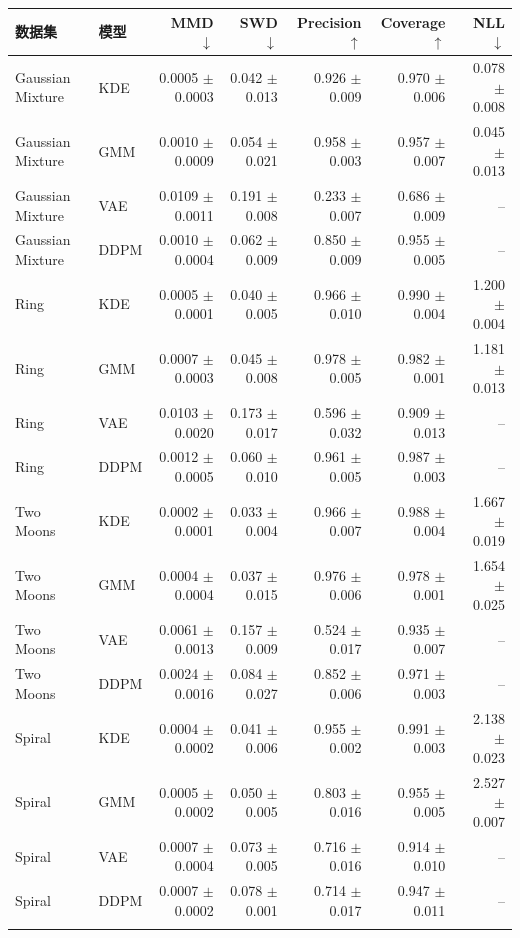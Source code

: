 \begin{tabular}{llrrrrr}
\toprule
数据集 & 模型 & MMD $\downarrow$ & SWD $\downarrow$ & Precision $\uparrow$ & Coverage $\uparrow$ & NLL $\downarrow$ \\
\midrule
Gaussian Mixture & KDE & 0.0005 $\pm$ 0.0003 & 0.042 $\pm$ 0.013 & 0.926 $\pm$ 0.009 & 0.970 $\pm$ 0.006 & 0.078 $\pm$ 0.008 \\
Gaussian Mixture & GMM & 0.0010 $\pm$ 0.0009 & 0.054 $\pm$ 0.021 & 0.958 $\pm$ 0.003 & 0.957 $\pm$ 0.007 & 0.045 $\pm$ 0.013 \\
Gaussian Mixture & VAE & 0.0109 $\pm$ 0.0011 & 0.191 $\pm$ 0.008 & 0.233 $\pm$ 0.007 & 0.686 $\pm$ 0.009 & -- \\
Gaussian Mixture & DDPM & 0.0010 $\pm$ 0.0004 & 0.062 $\pm$ 0.009 & 0.850 $\pm$ 0.009 & 0.955 $\pm$ 0.005 & -- \\
\addlinespace
Ring & KDE & 0.0005 $\pm$ 0.0001 & 0.040 $\pm$ 0.005 & 0.966 $\pm$ 0.010 & 0.990 $\pm$ 0.004 & 1.200 $\pm$ 0.004 \\
Ring & GMM & 0.0007 $\pm$ 0.0003 & 0.045 $\pm$ 0.008 & 0.978 $\pm$ 0.005 & 0.982 $\pm$ 0.001 & 1.181 $\pm$ 0.013 \\
Ring & VAE & 0.0103 $\pm$ 0.0020 & 0.173 $\pm$ 0.017 & 0.596 $\pm$ 0.032 & 0.909 $\pm$ 0.013 & -- \\
Ring & DDPM & 0.0012 $\pm$ 0.0005 & 0.060 $\pm$ 0.010 & 0.961 $\pm$ 0.005 & 0.987 $\pm$ 0.003 & -- \\
\addlinespace
Two Moons & KDE & 0.0002 $\pm$ 0.0001 & 0.033 $\pm$ 0.004 & 0.966 $\pm$ 0.007 & 0.988 $\pm$ 0.004 & 1.667 $\pm$ 0.019 \\
Two Moons & GMM & 0.0004 $\pm$ 0.0004 & 0.037 $\pm$ 0.015 & 0.976 $\pm$ 0.006 & 0.978 $\pm$ 0.001 & 1.654 $\pm$ 0.025 \\
Two Moons & VAE & 0.0061 $\pm$ 0.0013 & 0.157 $\pm$ 0.009 & 0.524 $\pm$ 0.017 & 0.935 $\pm$ 0.007 & -- \\
Two Moons & DDPM & 0.0024 $\pm$ 0.0016 & 0.084 $\pm$ 0.027 & 0.852 $\pm$ 0.006 & 0.971 $\pm$ 0.003 & -- \\
\addlinespace
Spiral & KDE & 0.0004 $\pm$ 0.0002 & 0.041 $\pm$ 0.006 & 0.955 $\pm$ 0.002 & 0.991 $\pm$ 0.003 & 2.138 $\pm$ 0.023 \\
Spiral & GMM & 0.0005 $\pm$ 0.0002 & 0.050 $\pm$ 0.005 & 0.803 $\pm$ 0.016 & 0.955 $\pm$ 0.005 & 2.527 $\pm$ 0.007 \\
Spiral & VAE & 0.0007 $\pm$ 0.0004 & 0.073 $\pm$ 0.005 & 0.716 $\pm$ 0.016 & 0.914 $\pm$ 0.010 & -- \\
Spiral & DDPM & 0.0007 $\pm$ 0.0002 & 0.078 $\pm$ 0.001 & 0.714 $\pm$ 0.017 & 0.947 $\pm$ 0.011 & -- \\
\addlinespace
\bottomrule
\end{tabular}